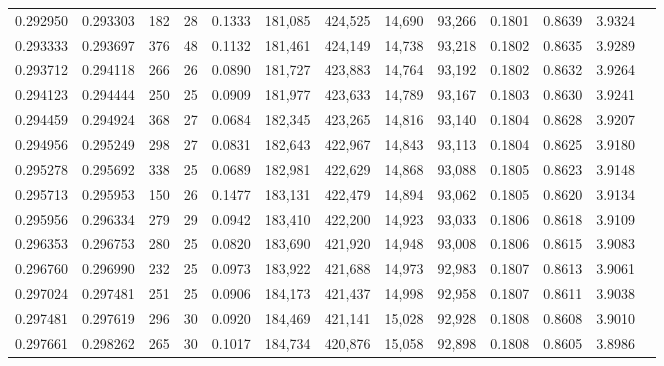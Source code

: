 \begin{tabular}{rrrrrrrrrrrrr}
0.292950 & 0.293303 &    182 &    28 &                                     0.1333 & 181,085 & 424,525 &  14,690 &  93,266 & 0.1801 & 0.8639 & 3.9324 \\
0.293333 & 0.293697 &    376 &    48 &                                     0.1132 & 181,461 & 424,149 &  14,738 &  93,218 & 0.1802 & 0.8635 & 3.9289 \\
0.293712 & 0.294118 &    266 &    26 &                                     0.0890 & 181,727 & 423,883 &  14,764 &  93,192 & 0.1802 & 0.8632 & 3.9264 \\
0.294123 & 0.294444 &    250 &    25 &                                     0.0909 & 181,977 & 423,633 &  14,789 &  93,167 & 0.1803 & 0.8630 & 3.9241 \\
0.294459 & 0.294924 &    368 &    27 &                                     0.0684 & 182,345 & 423,265 &  14,816 &  93,140 & 0.1804 & 0.8628 & 3.9207 \\
0.294956 & 0.295249 &    298 &    27 &                                     0.0831 & 182,643 & 422,967 &  14,843 &  93,113 & 0.1804 & 0.8625 & 3.9180 \\
0.295278 & 0.295692 &    338 &    25 &                                     0.0689 & 182,981 & 422,629 &  14,868 &  93,088 & 0.1805 & 0.8623 & 3.9148 \\
0.295713 & 0.295953 &    150 &    26 &                                     0.1477 & 183,131 & 422,479 &  14,894 &  93,062 & 0.1805 & 0.8620 & 3.9134 \\
0.295956 & 0.296334 &    279 &    29 &                                     0.0942 & 183,410 & 422,200 &  14,923 &  93,033 & 0.1806 & 0.8618 & 3.9109 \\
0.296353 & 0.296753 &    280 &    25 &                                     0.0820 & 183,690 & 421,920 &  14,948 &  93,008 & 0.1806 & 0.8615 & 3.9083 \\
0.296760 & 0.296990 &    232 &    25 &                                     0.0973 & 183,922 & 421,688 &  14,973 &  92,983 & 0.1807 & 0.8613 & 3.9061 \\
0.297024 & 0.297481 &    251 &    25 &                                     0.0906 & 184,173 & 421,437 &  14,998 &  92,958 & 0.1807 & 0.8611 & 3.9038 \\
0.297481 & 0.297619 &    296 &    30 &                                     0.0920 & 184,469 & 421,141 &  15,028 &  92,928 & 0.1808 & 0.8608 & 3.9010 \\
0.297661 & 0.298262 &    265 &    30 &                                     0.1017 & 184,734 & 420,876 &  15,058 &  92,898 & 0.1808 & 0.8605 & 3.8986 \\

\end{tabular}

